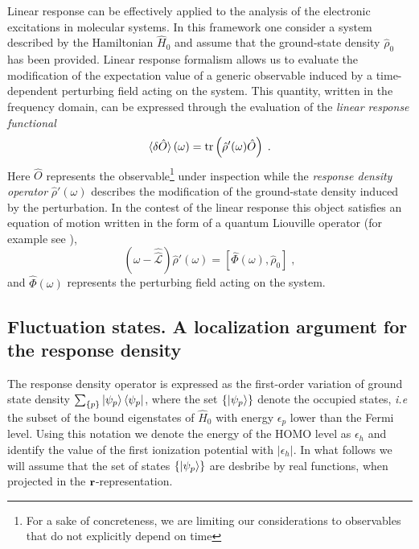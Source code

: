\documentclass[reprint,aps,prb]{revtex4-1}
\renewcommand{\r}{{\bf r}}
\newcommand{\eps}{\epsilon}
\newcommand{\be}{\begin{equation}}
\newcommand{\ee}{\end{equation}}
\newcommand{\lb}{\label}
\newcommand{\op}[1]{\hat {#1}}
\newcommand{\sop}[1]{\op{\op {#1}}}
\newcommand{\commutator}[2]{\left[ {#1} , {#2} \right]}
\newcommand{\trace}[1]{\mathrm{tr}\left(#1\right)}
\newcommand{\dmnot}{\op{\rho}_0}
\newcommand{\dm}{\op{\rho}}
\newcommand{\hnot}{\op{H}_0}
\newcommand{\Liouv}{\sop{\mathcal L}}
\begin{document}
Linear response can be effectively applied to the analysis of the electronic excitations in molecular systems. In this framework one consider a system 
described by the Hamiltonian $\hnot$ and assume that the ground-state density $\dmnot$ has been provided. Linear response formalism allows us to evaluate the modification 
of the expectation value of a generic observable induced by a time-dependent perturbing field acting on the system. This quantity, written in the frequency domain, can be expressed 
through the evaluation of the \emph{linear response functional}
\be\lb{LinearResponseFunctDef1}
\braket{\delta\op O}(\omega) = \trace{\dm'(\omega)\op O} \;.
\ee
Here $\op O$ represents the observable\footnote{For a sake of concreteness, we are limiting our considerations to observables that do not explicitly depend on time} 
under inspection while the \emph{response density operator} $\dm'(\omega)$ describes the modification of the ground-state density induced by the perturbation. In the contest
of the linear response this object satisfies an equation of motion written in the form of a quantum Liouville operator (for example see \cite{baroni2008}),
\be\lb{LiouvillianRhopomegaDef1}
\left(\omega - \Liouv\right) \dm'(\omega) =  \commutator{\op\Phi(\omega)}{\dmnot} \;,
\ee
and $\op\Phi(\omega)$ represents the perturbing field acting on the system. 

\subsection{Fluctuation states. A localization argument for the response density}

The response density operator is expressed as the first-order variation of ground state density $\sum_{\{p\}} \ket{\psi_p} \bra{\psi_p}$, where the set $\{\ket{\psi_p}\}$ denote the 
occupied states, \emph{i.e} the subset of the bound eigenstates of $\hnot$ with energy $\eps_p$ lower than the Fermi level. Using this notation we denote the energy of the HOMO level 
as $\eps_h$ and identify the value of the first ionization potential with $|\eps_h|$. In what follows we will assume that the set of states $\{\ket{\psi_p}\}$ are desbribe by real 
functions, when projected in the $\r$-representation.  
\end{document}
